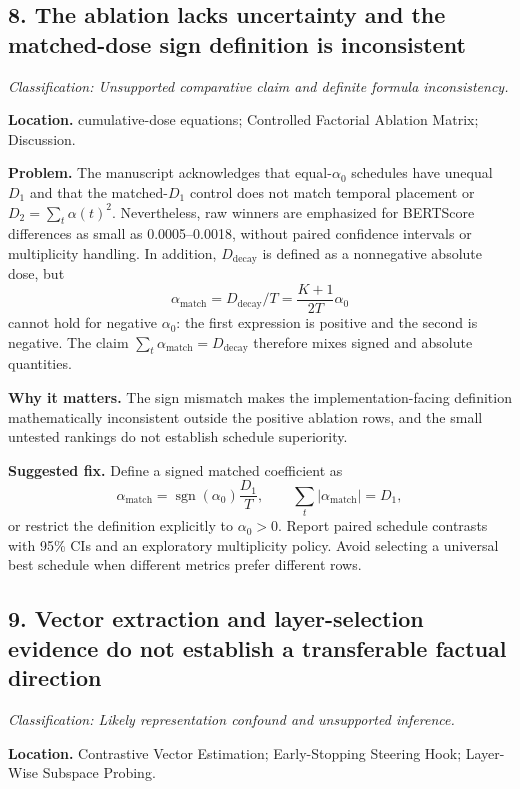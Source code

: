 \documentclass[11pt]{article}
\newcommand{\findinglabel}[1]{\textbf{#1}}
\newcommand{\classification}[1]{\textit{Classification: #1.}}
\begin{document}
\subsection*{8. The ablation lacks uncertainty and the matched-dose sign definition is inconsistent}

\classification{Unsupported comparative claim and definite formula inconsistency}

\findinglabel{Location.} cumulative-dose equations; Controlled Factorial Ablation Matrix; Discussion.

\findinglabel{Problem.} The manuscript acknowledges that equal-$\alpha_0$ schedules have unequal $D_1$ and that the matched-$D_1$ control does not match temporal placement or $D_2=\sum_t\alpha(t)^2$.  Nevertheless, raw winners are emphasized for BERTScore differences as small as 0.0005--0.0018, without paired confidence intervals or multiplicity handling.  In addition, $D_{\text{decay}}$ is defined as a nonnegative absolute dose, but
\[
\alpha_{\text{match}}=D_{\text{decay}}/T
=\frac{K+1}{2T}\alpha_0
\]
cannot hold for negative $\alpha_0$: the first expression is positive and the second is negative.  The claim $\sum_t\alpha_{\text{match}}=D_{\text{decay}}$ therefore mixes signed and absolute quantities.

\findinglabel{Why it matters.} The sign mismatch makes the implementation-facing definition mathematically inconsistent outside the positive ablation rows, and the small untested rankings do not establish schedule superiority.

\findinglabel{Suggested fix.} Define a signed matched coefficient as
\[
\alpha_{\text{match}}
=\operatorname{sgn}(\alpha_0)\frac{D_1}{T},
\qquad
\sum_t|\alpha_{\text{match}}|=D_1,
\]
or restrict the definition explicitly to $\alpha_0>0$.  Report paired schedule contrasts with 95\% CIs and an exploratory multiplicity policy.  Avoid selecting a universal best schedule when different metrics prefer different rows.

\subsection*{9. Vector extraction and layer-selection evidence do not establish a transferable factual direction}

\classification{Likely representation confound and unsupported inference}

\findinglabel{Location.} Contrastive Vector Estimation; Early-Stopping Steering Hook; Layer-Wise Subspace Probing.
\end{document}
